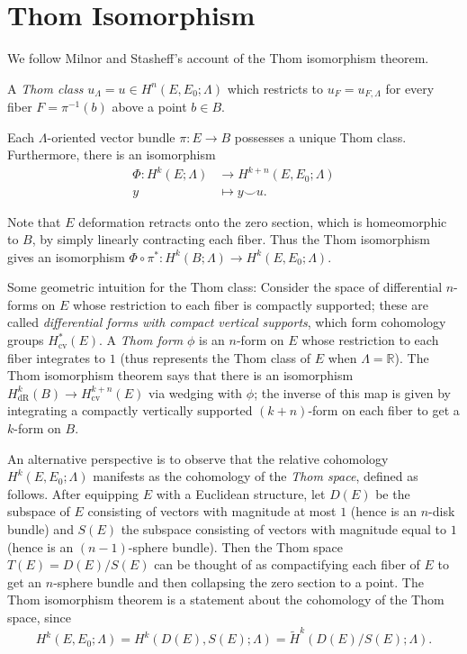 \documentclass[10pt]{article}
\providecommand{\RR}{\mathbb R}
\providecommand{\inv}{^{-1}}
\providecommand{\vocab}[1]{{{\sffamily\textit{#1}}}}
\begin{document}
\section{Thom Isomorphism}
We follow Milnor and Stasheff's account of the Thom isomorphism theorem.

\begin{definition}
    \label{def:thom-class}
    A \vocab{Thom class} $u_\Lambda = u\in H^n(E,E_0;\Lambda)$
    which restricts to $u_F = u_{F,\Lambda}$ for every fiber
    $F = \pi\inv(b)$ above a point $b\in B$.
\end{definition}

\begin{theorem}
    \label{thm:thom-isomorphism}
    Each $\Lambda$-oriented vector bundle $\pi\colon E\to B$
    possesses a unique Thom class. Furthermore, there is an isomorphism
    \begin{align*}
	\Phi\colon{} H^k(E;\Lambda)&\to H^{k+n}(E,E_0;\Lambda)\\
	y&\mapsto y\smile u.
    \end{align*}
\end{theorem}

Note that $E$ deformation retracts onto the zero section,
which is homeomorphic to $B$, by simply linearly contracting each fiber.
Thus the Thom isomorphism gives an isomorphism
$\Phi\circ\pi^*\colon H^k(B;\Lambda)\to H^k(E,E_0;\Lambda)$.

Some geometric intuition for the Thom class:
Consider the space of differential $n$-forms on $E$
whose restriction to each fiber is compactly supported;
these are called \vocab{differential forms with compact vertical supports},
which form cohomology groups $H^*_{\text{cv}}(E)$.
A \vocab{Thom form} $\phi$ is an $n$-form on $E$
whose restriction to each fiber integrates to $1$
(thus represents the Thom class of $E$ when $\Lambda = \RR$).
The Thom isomorphism theorem says that there is an isomorphism
$H_{\text{dR}}^k(B)\to H^{k+n}_{\text{cv}}(E)$
via wedging with $\phi$; the inverse of this map
is given by integrating a compactly vertically supported $(k+n)$-form
on each fiber to get a $k$-form on $B$.

An alternative perspective is to observe that
the relative cohomology $H^k(E,E_0;\Lambda)$ manifests
as the cohomology of the \vocab{Thom space}, defined as follows.
After equipping $E$ with a Euclidean structure,
let $D(E)$ be the subspace of $E$ consisting of vectors
with magnitude at most $1$ (hence is an $n$-disk bundle)
and $S(E)$ the subspace consisting of vectors
with magnitude equal to $1$ (hence is an $(n-1)$-sphere bundle).
Then the Thom space $T(E) = D(E)/S(E)$ can be thought of
as compactifying each fiber of $E$ to get an $n$-sphere bundle
and then collapsing the zero section to a point.
The Thom isomorphism theorem is a statement about
the cohomology of the Thom space, since
\begin{equation*}
    H^k(E,E_0;\Lambda) = H^k(D(E), S(E);\Lambda)
    = \widetilde H^k(D(E)/S(E);\Lambda).
\end{equation*}
\end{document}
